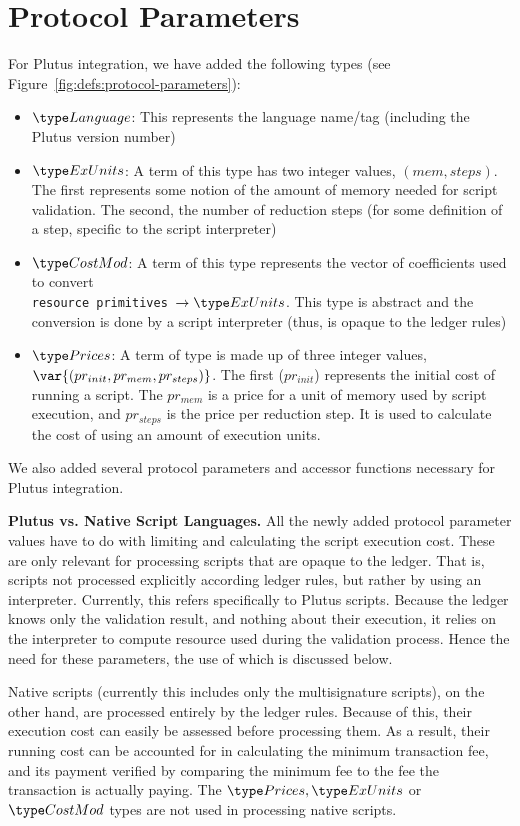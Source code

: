 \section{Protocol Parameters}
\label{sec:protocol-parameters}

For Plutus integration, we have added the following types
(see Figure~\ref{fig:defs:protocol-parameters}):

\begin{itemize}
\item $\Language$: This represents the language name/tag (including the Plutus
version number)
\item $\ExUnits$: A term of this type has two integer values, $(mem, steps)$. The first
represents some notion of the amount of memory needed for script validation.
The second, the number of reduction steps (for some definition of a step, specific
to the script interpreter)
\item $\CostMod$: A term of this type represents the vector of coefficients used to convert \\
\texttt{resource primitives}~$\to \ExUnits$. This type is abstract and the
conversion is done by a script interpreter (thus, is opaque to the ledger rules)
\item $\Prices$: A term of type is made up of three integer values,
$\var{(pr_{init}, pr_{mem}, pr_{steps})}$. The first ($pr_{init}$) represents the initial
cost of running a script. The $pr_{mem}$ is a price for a unit of memory
used by script execution, and $pr_{steps}$ is the price per
reduction step. It is used to calculate the cost of using an amount of execution
units.
\end{itemize}

We also added several protocol parameters and accessor functions necessary for
Plutus integration.

\textbf{Plutus vs. Native Script Languages.}
All the newly added protocol parameter values have to do with limiting and calculating
the script execution cost.
These are only relevant for processing scripts that are opaque
to the ledger. That is, scripts not processed explicitly according ledger rules,
but rather by using an interpreter. Currently, this refers specifically
to Plutus scripts. Because the ledger knows only the validation result, and
nothing about their execution, it relies on the interpreter to compute resource
used during the validation process. Hence the need for these parameters,
the use of which is discussed below.

Native scripts (currently this includes only the multisignature scripts), on the
other hand, are processed entirely by the ledger rules.
Because of this, their execution cost can easily be assessed before processing them.
As a result, their running cost can be accounted for in calculating the minimum transaction
fee, and its payment verified by comparing the minimum fee to the fee the transaction
is actually paying. The $\Prices, \ExUnits$ or $\CostMod$ types are not used
in processing native scripts.

